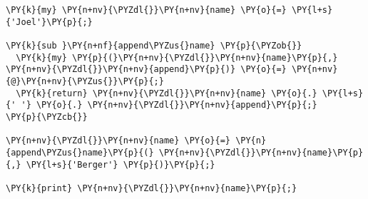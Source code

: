 \begin{Verbatim}[commandchars=\\\{\}]
\PY{k}{my} \PY{n+nv}{\PYZdl{}}\PY{n+nv}{name} \PY{o}{=} \PY{l+s}{'Joel'}\PY{p}{;}

\PY{k}{sub }\PY{n+nf}{append\PYZus{}name} \PY{p}{\PYZob{}}
  \PY{k}{my} \PY{p}{(}\PY{n+nv}{\PYZdl{}}\PY{n+nv}{name}\PY{p}{,} \PY{n+nv}{\PYZdl{}}\PY{n+nv}{append}\PY{p}{)} \PY{o}{=} \PY{n+nv}{@}\PY{n+nv}{\PYZus{}}\PY{p}{;}
  \PY{k}{return} \PY{n+nv}{\PYZdl{}}\PY{n+nv}{name} \PY{o}{.} \PY{l+s}{' '} \PY{o}{.} \PY{n+nv}{\PYZdl{}}\PY{n+nv}{append}\PY{p}{;}
\PY{p}{\PYZcb{}}

\PY{n+nv}{\PYZdl{}}\PY{n+nv}{name} \PY{o}{=} \PY{n}{append\PYZus{}name}\PY{p}{(} \PY{n+nv}{\PYZdl{}}\PY{n+nv}{name}\PY{p}{,} \PY{l+s}{'Berger'} \PY{p}{)}\PY{p}{;}

\PY{k}{print} \PY{n+nv}{\PYZdl{}}\PY{n+nv}{name}\PY{p}{;}
\end{Verbatim}
